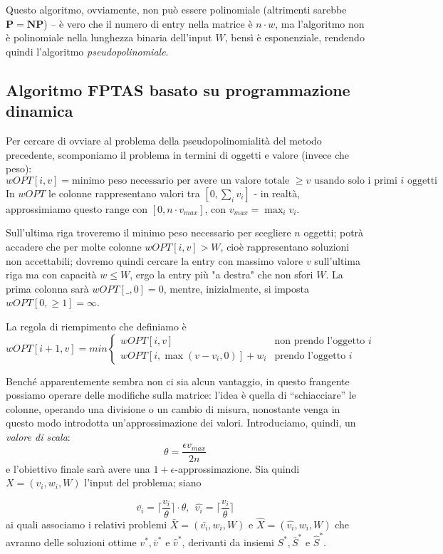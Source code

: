Questo algoritmo, ovviamente, non può essere polinomiale (altrimenti sarebbe
$\mathbf{P} = \mathbf{NP}$) -- è vero che il
numero di entry nella matrice è $n \cdot w$, ma l'algoritmo non è polinomiale nella
lunghezza binaria dell'input $W$, bensì è esponenziale, rendendo quindi l'algoritmo
\textit{pseudopolinomiale}.

\subsection{Algoritmo FPTAS basato su programmazione dinamica}
Per cercare di ovviare al problema della pseudopolinomialità del metodo precedente,
scomponiamo il problema in termini di oggetti e valore (invece che peso):
$$
	wOPT[i, v] = \text{minimo peso necessario per avere un valore totale } \geq v \text{ usando solo i primi } i \text { oggetti }
$$
In $wOPT$ le colonne rappresentano valori tra $[0, \sum_{i}v_i]$ - in realtà,
approssimiamo questo range con $[0, n\cdot v_{max}]$, con $v_{max} = \max_i v_i$.

Sull'ultima riga troveremo il minimo peso necessario per scegliere $n$ oggetti;
potrà accadere che per molte colonne $wOPT[i,v] > W$, cioè rappresentano
soluzioni non accettabili; dovremo quindi cercare la entry con massimo valore $v$
sull'ultima riga ma con capacità $w \leq W$, ergo la entry più "a destra" che
non sfori $W$. La prima colonna sarà $wOPT[\_,0] = 0$, mentre, inizialmente,
si imposta $wOPT[0,\geq1] = \infty$.

La regola di riempimento che definiamo è
$$
	wOPT[i+1, v] = min
	\begin{cases}
		wOPT[i, v]						& \text{non prendo l'oggetto } i \\
		wOPT[i, \max(v-v_i, 0)] + w_i	& \text{prendo l'oggetto } i
	\end{cases}
$$

Benché apparentemente sembra non ci sia alcun vantaggio, in questo frangente
possiamo operare delle modifiche sulla matrice: l'idea è quella di ``schiacciare''
le colonne, operando una divisione o un cambio di misura, nonostante venga
in questo modo introdotta un'approssimazione dei valori. Introduciamo,
quindi, un \textit{valore di scala}:
$$
	\theta = \frac{\epsilon v_{max}}{2n}
$$
e l'obiettivo finale sarà avere una $1+\epsilon$-approssimazione.
Sia quindi $X=(v_i, w_i, W)$ l'input del problema; siano

$$
	\bar{v_i} = \lceil\frac{v_i}{\theta}\rceil\cdot \theta, ~~ \hat{v_i} = \lceil \frac{v_i}{\theta}\rceil
$$
ai quali associamo i relativi problemi $\bar{X} = (\bar{v_i}, w_i, W)$
e $\hat{X} = (\hat{v_i}, w_i, W)$
che avranno delle soluzioni ottime $v^*, \bar{v}^*$ e $\hat{v}^*$, derivanti
da insiemi $S^*, \bar{S}^*$ e $\hat{S}^*$.

